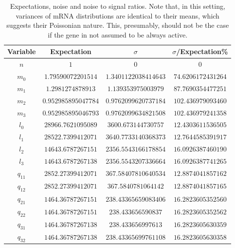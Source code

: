 \documentclass[a4paper, 11pt]{article}
\begin{document}
\begin{table}
  \begin{center}
    \begin{tabular}{ |c|c|c|c| }
      \hline
      Variable &Expectation          & $\sigma$    & $\sigma$/Expectation\%\\  \hline
      $n$      & $1$                 & $0$    & $0$ \\                 \hline
      $m_0$    & $1.79590072201514$  & $1.3401122038414643$ & $74.6206172431264$\\  \hline
      $m_1$    & $1.2981274878913$   & $1.139353975003979$ & $87.7690354477251$\\   \hline
      $m_2$    & $0.952985895047784$ & $0.9762099620737184$ & $102.436979093460$\\ \hline
      $m_3$    & $0.952985895046793$ & $0.9762099634821508$ & $102.436979241358$\\ \hline
      $l_0$    & $28966.7621095089$  & $3600.673144730757$ & $12.4303611536505$\\  \hline
      $l_1$    & $28522.7399412071$  & $3640.7733140368373$ & $12.7644585391917$\\  \hline
      $l_2$    & $14643.6787267151$  & $2356.5543166178854$ & $16.0926387460190$\\  \hline
      $l_3$    & $14643.6787267138$  & $2356.5543207336664$ & $16.0926387741265$\\  \hline
      $q_{11}$ & $2852.27399412071$  & $367.58407810640534$ & $12.8874041857162$\\  \hline
      $q_{12}$ & $2852.27399412071$  & $367.5840781064142$ & $12.8874041857165$\\  \hline
      $q_{21}$ & $1464.36787267151$  & $238.43365659083406$ & $16.2823605352560$\\  \hline
      $q_{22}$ & $1464.36787267151$  & $238.433656590837$ & $16.2823605352562$ \\  \hline
      $q_{31}$ & $1464.36787267138$  & $238.433656997613$ & $16.2823605630359$ \\  \hline
      $q_{32}$ & $1464.36787267138$ & $238.43365699761108$ & $16.2823605630358$ \\
      \hline
    \end{tabular}
    \caption{\label{table:expectations_errors}Expectations, noise and noise to signal ratios. Note that, in this setting, variances of mRNA distributions are identical to their means, which suggests their Poissonian nature. This, presumably, should not be the case if the gene in not assumed to be always active.}
  \end{center}
\end{table}
\end{document}
